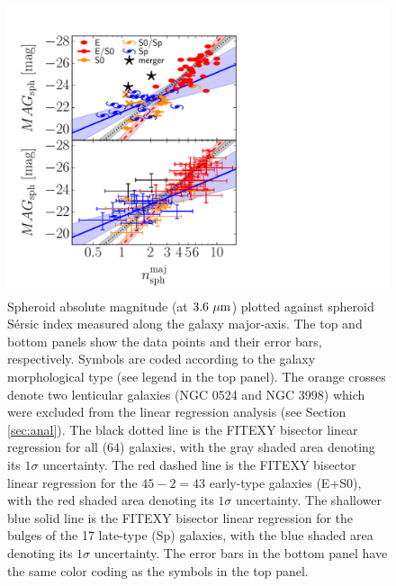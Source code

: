 \documentclass[preprint2]{emulateapj}
\begin{document}
\begin{figure}[h]
\begin{center}
\includegraphics[width=\columnwidth, trim = 20 0 220 0]{mag_vs_n_maj.pdf}
\caption{Spheroid absolute magnitude (at $3.6\rm~\mu m$) plotted against spheroid S\'ersic index 
measured along the galaxy major-axis. 
The top and bottom panels show the data points and their error bars, respectively.  
Symbols are coded according to the galaxy morphological type (see legend in the top panel).
The orange crosses denote two lenticular galaxies (NGC 0524 and NGC 3998) which were excluded from the linear regression analysis 
(see Section \ref{sec:anal}). 
The black dotted line is the FITEXY bisector linear regression for all ($64$) galaxies, 
with the gray shaded area denoting its $1\sigma$ uncertainty. 
The red dashed line is the FITEXY bisector linear regression for the $45-2=43$  early-type galaxies (E+S0), 
with the red shaded area denoting its $1\sigma$ uncertainty. 
The shallower blue solid line is the FITEXY bisector linear regression for the bulges of the 17 late-type (Sp) galaxies, 
with the blue shaded area denoting its $1\sigma$ uncertainty. 
The error bars in the bottom panel have the same color coding as the symbols in the top panel. 
}
\label{fig:magn}
\end{center}
\end{figure}
\end{document}
